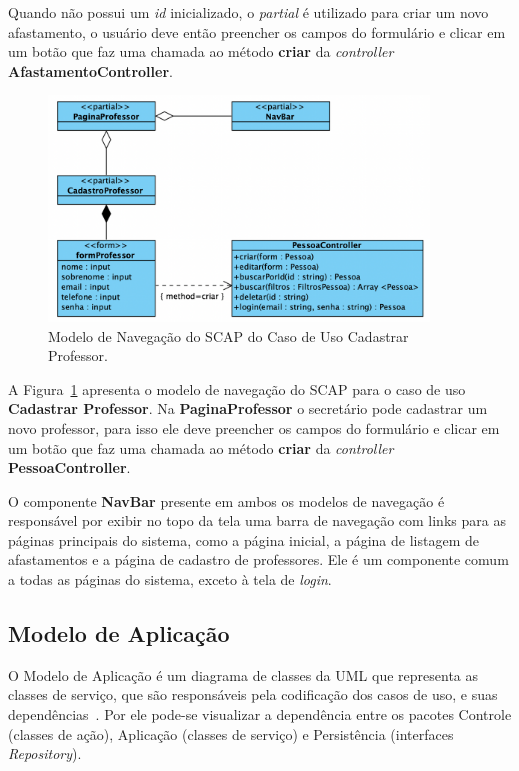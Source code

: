 Quando não possui um \textit{id} inicializado, o \textit{partial} é utilizado para criar um novo afastamento,
o usuário deve então preencher os campos do formulário e clicar em um botão que faz uma chamada ao método
\textbf{criar} da \textit{controller} \textbf{AfastamentoController}.


\begin{figure}
    \centering
    \includegraphics[width=0.9\textwidth]{figuras/fig-modelo-naveg-cadast.png}
    \caption{Modelo de Navegação do SCAP do Caso de Uso Cadastrar Professor.}
    \label{fig-modelo-navegacao-professor}
\end{figure}

A Figura~\ref{fig-modelo-navegacao-professor} apresenta o modelo de navegação do SCAP para o caso de uso
\textbf{Cadastrar Professor}. Na \textbf{PaginaProfessor} o secretário pode cadastrar um novo professor,
para isso ele deve preencher os campos do formulário e clicar em um botão que faz uma chamada ao método
\textbf{criar} da \textit{controller} \textbf{PessoaController}.


O componente \textbf{NavBar} presente em ambos os modelos de navegação é responsável por exibir
no topo da tela uma barra de navegação com links para as páginas principais do sistema, como a página inicial,
a página de listagem de afastamentos e a página de cadastro de professores. Ele é um componente
comum a todas as páginas do sistema, exceto à tela de \textit{login}.

\subsection{Modelo de Aplicação}
\label{subsec-frameweb-aplicacao}
O Modelo de Aplicação é um diagrama de classes da UML que representa as classes de
serviço, que são responsáveis pela codificação dos casos de uso, e suas dependências~\cite{souza:2007}.
Por ele pode-se visualizar a dependência entre os pacotes Controle (classes de ação),
Aplicação (classes de serviço) e Persistência (interfaces \textit{Repository}). 


